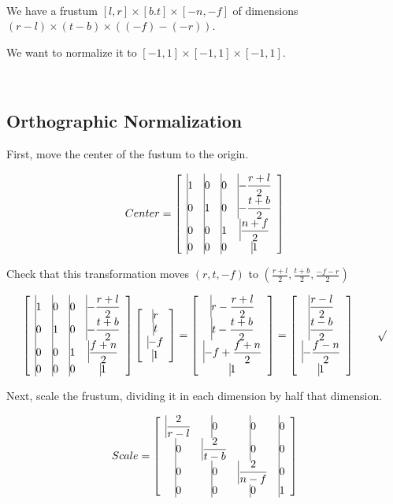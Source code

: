 \documentclass[11pt]{article}
\begin{document}
\begin{spacing}{1.2}
\

We have a frustum $[l,r] \times [b.t] \times [-n,-f]$ of dimensions $(r-l)\times (t-b) \times ((-f)-(-r))$.  

We want to normalize it to $[-1,1] \times [-1,1] \times [-1,1]$.  

\

\subsection{Orthographic Normalization}

First, move the center of the fustum to the origin.  

$$
Center = 
\left[
	\begin{array}{*4{>{\displaystyle\vrule width 0pt height 16pt depth 12pt}c}}
		1 & 0 & 0 & -\frac{r+l}{2} \cr
		0 & 1 & 0 & -\frac{t+b}{2} \cr
		0 & 0 & 1 & \frac{n+f}{2} \cr
		0 & 0 & 0 & 1 \cr
	\end{array}
\right]
$$

Check that this transformation moves $(r,t,-f)$ to $\left( \frac{r+l}{2}, \frac{t+b}{2}, \frac{-f-r}{2} \right)$

$$
\left[
	\begin{array}{*4{>{\displaystyle\vrule width 0pt height 16pt depth 12pt}c}}
		1 & 0 & 0 & -\frac{r+l}{2} \cr
		0 & 1 & 0 & -\frac{t+b}{2} \cr
		0 & 0 & 1 & \frac{f+n}{2} \cr
		0 & 0 & 0 & 1 \cr
	\end{array}
\right]
\left[
	\begin{array}{>{\displaystyle\vrule width 0pt height 16pt depth 12pt}c}
		r \cr t \cr -f \cr 1
	\end{array}
\right]
=
\left[
	\begin{array}{*4{>{\displaystyle\vrule width 0pt height 16pt depth 12pt}c}}
		r - \frac{r+l}{2} \cr
		t - \frac{t+b}{2} \cr
		-f +\frac{f+n}{2} \cr
		1
	\end{array}
\right]
=
\left[
	\begin{array}{*4{>{\displaystyle\vrule width 0pt height 16pt depth 12pt}c}}
		\frac{r-l}{2} \cr
		\frac{t-b}{2} \cr
		- \frac{f-n}{2} \cr
		1
	\end{array}
\right]
\qquad \surd
$$

Next, scale the frustum, dividing it in each dimension by half that dimension.  

$$
Scale = 
\left[
	\begin{array}{*4{>{\displaystyle\vrule width 0pt height 16pt depth 12pt}c}}
		\frac{2}{r-l} & 0 & 0 & 0 \cr
		0 & \frac{2}{t-b} & 0 & 0 \cr
		0 & 0 & \frac{2}{n-f} & 0 \cr
		0 & 0 & 0 & 1 \cr
	\end{array}
\right]
$$


\end{spacing}
\end{document}
